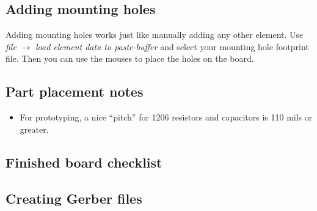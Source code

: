 \clearpage
\subsection{Adding mounting holes}
Adding mounting holes works just like manually adding any other element.  Use \textsl{file} $\rightarrow$ \textsl{load element data to paste-buffer} and select your mounting hole footprint file.  Then you can use the mouses to place the holes on the board.

\clearpage
\subsection{Part placement notes}

\begin{itemize}
    \item For prototyping, a nice ``pitch'' for 1206 resistors and capacitors is 110 mils or greater.
\end{itemize}

\clearpage
\subsection{Finished board checklist}


\clearpage
\subsection{Creating Gerber files}


